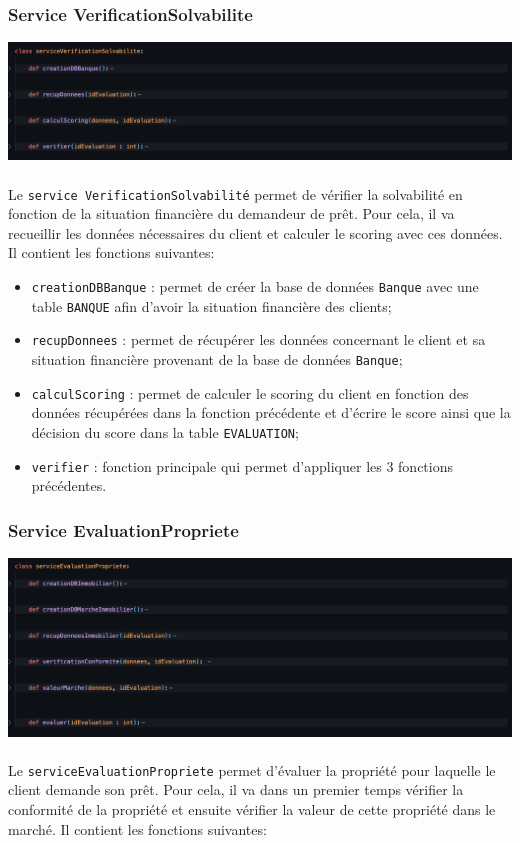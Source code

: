 \documentclass{article}
\begin{document}
            
        \subsubsection{Service VerificationSolvabilite}
            \includegraphics[width=\textwidth]{Images/11.2/solvabilite.png} \\ \\ 
             Le \texttt{service VerificationSolvabilité} permet de vérifier la solvabilité en fonction de la situation financière du demandeur de prêt. Pour cela, il va recueillir les données nécessaires du client et calculer le scoring avec ces données. Il contient les fonctions suivantes:
             
            \begin{itemize}
            \item \texttt{creationDBBanque} : permet de créer la base de données \texttt{Banque} avec une table \texttt{BANQUE} afin d'avoir la situation financière des clients;
            \item \texttt{recupDonnees} : permet de récupérer les données concernant le client et sa situation financière provenant de la base de données \texttt{Banque};
            \item \texttt{calculScoring} : permet de calculer le scoring du client en fonction des données récupérées dans la fonction précédente et d'écrire le score ainsi que la décision du score dans la table \texttt{EVALUATION};
            \item \texttt{verifier} : fonction principale qui permet d'appliquer les 3 fonctions précédentes.
            \end{itemize}

        \subsubsection{Service EvaluationPropriete}
            \includegraphics[width=\textwidth]{Images/11.2/evaluation.png} \\ \\ 
            Le \texttt{serviceEvaluationPropriete} permet d'évaluer la propriété pour laquelle le client demande son prêt. Pour cela, il va dans un premier temps vérifier la conformité de la propriété et ensuite vérifier la valeur de cette propriété dans le marché. Il contient les fonctions suivantes:
            
\end{document}
